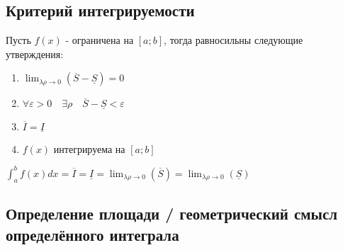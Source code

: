 \documentclass[11pt]{article}
\begin{document}
        \subsection{Критерий интегрируемости}
        Пусть $f(x)$ - ограничена на $[a; b]$, тогда равносильны следующие утверждения:
        \begin{enumerate}
            \item $\lim_{\lambda \rho \to 0} (\overline{S} - \underline{S}) = 0$
            \item $\forall \varepsilon > 0 \quad \exists \rho \quad \overline{S} - \underline{S} < \varepsilon$
            \item $\overline{I} = \underline{I}$
            \item $f(x)$ интегрируема на $[a; b]$ 
        \end{enumerate}
        $\int_{a}^{b} f(x)dx = \overline{I} = \underline{I} = \lim_{\lambda \rho \to 0} (\overline{S}) = \lim_{\lambda \rho \to 0} (\underline{S})$

        \subsection{Определение площади / геометрический смысл определённого интеграла}
        
\end{document}

